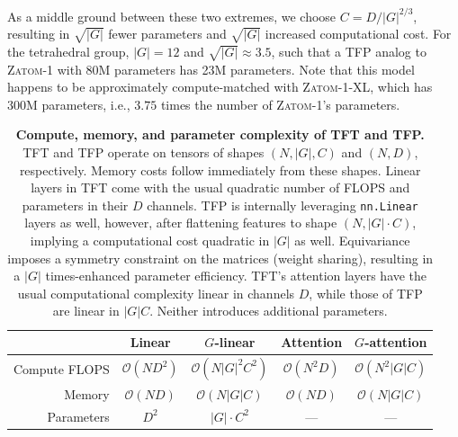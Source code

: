 \documentclass{article}
\theoremstyle{plain}
\theoremstyle{definition}
\theoremstyle{remark}
\begin{document}
As a middle ground between these two extremes, we choose $C = D/|G|^{2/3}$,
resulting in $\sqrt{|G|}$ fewer parameters and $\sqrt{|G|}$ increased computational cost.
For the tetrahedral group, $|G|=12$ and $\sqrt{|G|}\approx 3.5$, such that a TFP analog to \textsc{Zatom-1} with 80M parameters has 23M parameters. Note that this model happens to be approximately compute-matched with \textsc{Zatom-1-XL}, which has 300M parameters, i.e., $3.75$ times the number of \textsc{Zatom-1}'s parameters.

\begin{table}[t]
    \vspace*{1ex}
    \centering
    \small
    \renewcommand{\arraystretch}{1.45}
    \setlength{\tabcolsep}{6pt}
    \begin{tabular}{r@{\hskip40pt}c c@{\hskip40pt}c c}
        \toprule
                      & Linear              & $G$-linear               & Attention           & $G$-attention \\
        \midrule
        Compute FLOPS & $\mathcal{O}(ND^2)$ & $\mathcal{O}(N|G|^2C^2)$ & $\mathcal{O}(N^2D)$ & $\mathcal{O}(N^2|G|C)$ \\
        Memory        & $\mathcal{O}(ND)$   & $\mathcal{O}(N|G|C)$     & $\mathcal{O}(ND)$   & $\mathcal{O}(N|G|C)$ \\
        Parameters    & $D^2$               & $|G| \!\cdot\! C^2$      & ---                 & --- \\
        \bottomrule
    \end{tabular}
    \vspace*{2ex}
    \caption{
        \textbf{Compute, memory, and parameter complexity of TFT and TFP.}
        TFT and TFP operate on tensors of shapes $(N,|G|,C)$ and $(N,D)$, respectively. Memory costs follow immediately from these shapes. Linear layers in TFT come with the usual quadratic number of FLOPS and parameters in their $D$ channels. TFP is internally leveraging \texttt{nn.Linear} layers as well, however, after flattening features to shape $(N,|G|\!\cdot\!C)$, implying a computational cost quadratic in $|G|$ as well.
        Equivariance imposes a symmetry constraint on the matrices (weight sharing), resulting in a $|G|$ times-enhanced parameter efficiency. TFT's attention layers have the usual computational complexity linear in channels $D$, while those of TFP are linear in $|G|C$. Neither introduces additional parameters.
    }
    \label{appendix:table:TFP_complexity}
    \vspace{0.5em}
\end{table}
\end{document}
